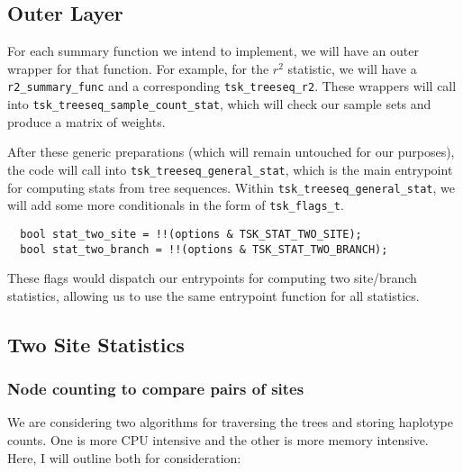 \documentclass[12pt]{article}
\newcommand{\ccode}[1]{\texttt{#1}}
\begin{document}
\subsection{Outer Layer}

For each summary function we intend to implement, we will have an outer wrapper
for that function. For example, for the $r^2$ statistic, we will have a
\ccode{r2_summary_func} and a corresponding \ccode{tsk_treeseq_r2}. These
wrappers will call into \ccode{tsk_treeseq_sample_count_stat}, which will check
our sample sets and produce a matrix of weights.

After these generic preparations (which will remain untouched for our purposes),
the code will call into \ccode{tsk_treeseq_general_stat}, which is the main
entrypoint for computing stats from tree sequences. Within
\ccode{tsk_treeseq_general_stat}, we will add some more conditionals in the form
of \ccode{tsk_flags_t}.

\begin{verbatim}
  bool stat_two_site = !!(options & TSK_STAT_TWO_SITE);
  bool stat_two_branch = !!(options & TSK_STAT_TWO_BRANCH);
\end{verbatim}

These flags would dispatch our entrypoints for computing two site/branch
statistics, allowing us to use the same entrypoint function for all statistics.

\subsection{Two Site Statistics}

\subsubsection{Node counting to compare pairs of sites}\label{section:node_counting}

We are considering two algorithms for traversing the trees and storing haplotype
counts. One is more CPU intensive and the other is more memory intensive. Here,
I will outline both for consideration:

\end{document}
